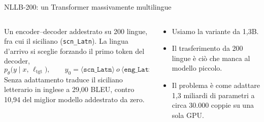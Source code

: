\documentclass[aspectratio=169]{beamer}
\newcommand{\T}[2]{#2}
\newcommand{\T}[2]{#1}
\begin{document}
\begin{frame}{\T{NLLB-200: a massively multilingual Transformer}%
                {NLLB-200: un Transformer massivamente multilingue}}
  \begin{columns}[t]
    \begin{column}{0.58\textwidth}
      \small
      \T{One encoder--decoder trained on 200 languages, Sicilian (\texttt{scn\_Latn}) among
      them. The target language is chosen by forcing the first token of the decoder,}%
      {Un encoder--decoder addestrato su 200 lingue, fra cui il siciliano (\texttt{scn\_Latn}).
      La lingua d'arrivo si sceglie forzando il primo token del decoder,}
      \[
        p_\theta\big(y\mid x,\,\ell_{\text{tgt}}\big),\qquad
        y_0=\langle\texttt{scn\_Latn}\rangle\ \T{or}{o}\ \langle\texttt{eng\_Latn}\rangle .
      \]
      \T{Out of the box it translates literary Sicilian into English at 29.00 BLEU, against
      10.94 for the best model trained from scratch.}%
      {Senza adattamento traduce il siciliano letterario in inglese a 29,00 BLEU, contro
      10,94 del miglior modello addestrato da zero.}
    \end{column}
    \begin{column}{0.42\textwidth}
      \small
      \begin{itemize}
        \item \T{We use the 1.3B variant.}{Usiamo la variante da 1,3B.}
        \item \T{The transfer from 200 languages is what the small model lacks.}%
              {Il trasferimento da 200 lingue \`e ci\`o che manca al modello piccolo.}
        \item \T{The question is how to adapt 1.3B parameters to some 30,000 pairs on a
              single GPU.}%
              {Il problema \`e come adattare 1,3 miliardi di parametri a circa 30.000 coppie su una sola GPU.}
      \end{itemize}
    \end{column}
  \end{columns}
\end{frame}
\end{document}
